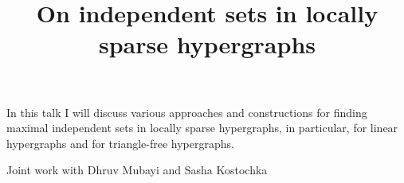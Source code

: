 \title{On independent sets in locally sparse hypergraphs}
\endtitle

In this talk I will discuss various approaches and constructions for finding maximal independent sets in locally sparse hypergraphs, in particular, for linear hypergraphs and for triangle-free hypergraphs. 

Joint work with Dhruv Mubayi and Sasha Kostochka
